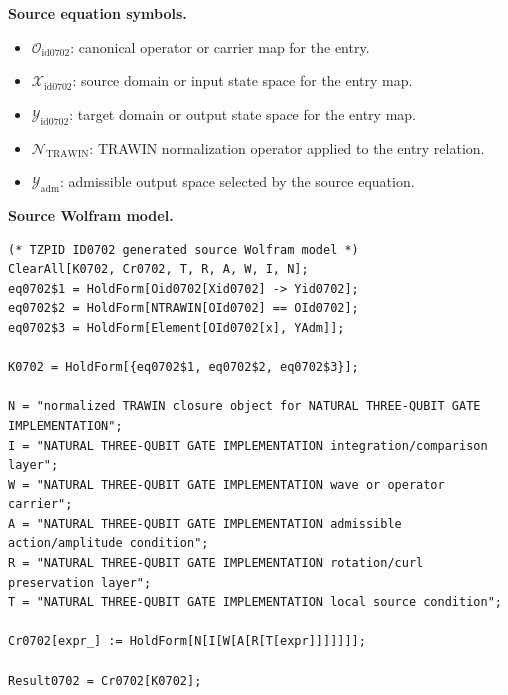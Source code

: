 \begin{minipage}[t]{0.49\linewidth}
\begingroup
\small
\raggedright
\textbf{Source equation symbols.}\par
\begin{itemize}[leftmargin=1.35em,itemsep=1pt,topsep=1pt,parsep=0pt]
    \item $\mathcal{O}_{\mathrm{id0702}}$: canonical operator or carrier map for the entry.
    \item $\mathcal{X}_{\mathrm{id0702}}$: source domain or input state space for the entry map.
    \item $\mathcal{Y}_{\mathrm{id0702}}$: target domain or output state space for the entry map.
    \item $\mathcal{N}_{\mathrm{TRAWIN}}$: TRAWIN normalization operator applied to the entry relation.
    \item $\mathcal{Y}_{\mathrm{adm}}$: admissible output space selected by the source equation.
\end{itemize}
\endgroup
\end{minipage}\hfill
\begin{minipage}[t]{0.47\linewidth}
\begingroup
\scriptsize
\raggedright
\textbf{Source Wolfram model.}\par
\begin{Verbatim}[fontsize=\tiny,breaklines=true,breakanywhere=true]
(* TZPID ID0702 generated source Wolfram model *)
ClearAll[K0702, Cr0702, T, R, A, W, I, N];
eq0702$1 = HoldForm[Oid0702[Xid0702] -> Yid0702];
eq0702$2 = HoldForm[NTRAWIN[OId0702] == OId0702];
eq0702$3 = HoldForm[Element[OId0702[x], YAdm]];

K0702 = HoldForm[{eq0702$1, eq0702$2, eq0702$3}];

N = "normalized TRAWIN closure object for NATURAL THREE-QUBIT GATE IMPLEMENTATION";
I = "NATURAL THREE-QUBIT GATE IMPLEMENTATION integration/comparison layer";
W = "NATURAL THREE-QUBIT GATE IMPLEMENTATION wave or operator carrier";
A = "NATURAL THREE-QUBIT GATE IMPLEMENTATION admissible action/amplitude condition";
R = "NATURAL THREE-QUBIT GATE IMPLEMENTATION rotation/curl preservation layer";
T = "NATURAL THREE-QUBIT GATE IMPLEMENTATION local source condition";

Cr0702[expr_] := HoldForm[N[I[W[A[R[T[expr]]]]]]];

Result0702 = Cr0702[K0702];
\end{Verbatim}
\endgroup
\end{minipage}

